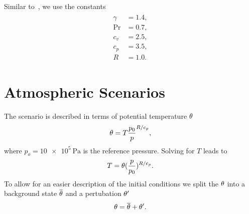 Similar to~\cite{helzel2000modified}, we use the constants
\begin{align}
  \begin{split}
  \gamma &= 1.4, \\
  \Pr &= 0.7, \\
  c_v &= 2.5, \\
  c_p &= 3.5, \\
  R &= 1.0.
  \end{split}
\end{align}

\section{Atmospheric Scenarios}
The scenario is described in terms of potential temperature $\theta$
\begin{equation}
  \theta = T \frac{p_0}{p}^{R/c_p},
\end{equation}
where $p_o = \SI{10e5}{\Pa}$ is the reference pressure.
Solving for $T$ leads to
\begin{equation}
  \label{eq:potTToT}
  T = \theta (\frac{p}{p_0})^{R/c_p}.
\end{equation}
To allow for an easier description of the initial conditions we split the $\theta$ into a background state $\overline{\theta}$ and a pertubation $\theta'$
\begin{equation}
  \label{eq:potT-split}
  \theta = \overline{\theta} + \theta'.
\end{equation}

